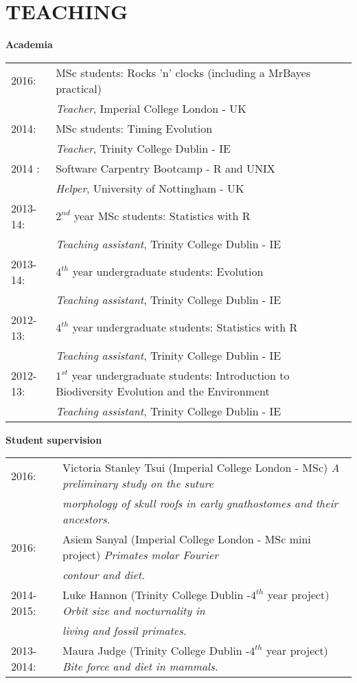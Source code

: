 \documentclass[10pt,a4paper]{article}
\begin{document}
{\section{TEACHING}
\bigskip

\raggedright\textbf{Academia}\\[1.5ex]
\begin{tabular}{ll}
2016: & MSc students: Rocks 'n' clocks (including a MrBayes practical)\\
& \textit{Teacher}, Imperial College London - UK \\
2014: & MSc students: Timing Evolution \\
& \textit{Teacher}, Trinity College Dublin - IE \\
2014 : & Software Carpentry Bootcamp - R and UNIX \\
& \textit{Helper}, University of Nottingham - UK \\
2013-14: & $2^{nd}$ year MSc students: Statistics with R \\
& \textit{Teaching assistant}, Trinity College Dublin - IE \\
2013-14: & $4^{th}$ year undergraduate students: Evolution\\
& \textit{Teaching assistant}, Trinity College Dublin - IE\\
2012-13: & $4^{th}$ year undergraduate students: Statistics with R\\
& \textit{Teaching assistant}, Trinity College Dublin - IE\\
2012-13: & $1^{st}$ year undergraduate students: Introduction to Biodiversity Evolution and the Environment\\
& \textit{Teaching assistant}, Trinity College Dublin - IE\\
\end{tabular}
\raggedright\textbf{Student supervision}\\[1.5ex]
\begin{tabular}{ll}
2016: & Victoria Stanley Tsui (Imperial College London - MSc) \textit{A preliminary study on the suture}\\
& \textit{morphology of skull roofs in early gnathostomes and their ancestors.}\\
2016: & Asiem Sanyal (Imperial College London - MSc mini project) \textit{Primates molar Fourier}\\
& \textit{contour and diet.}\\
2014-2015: & Luke Hannon (Trinity College Dublin -$4^{th}$ year project) \textit{Orbit size and nocturnality in}\\
& \textit{living and fossil primates.}\\
2013-2014: & Maura Judge (Trinity College Dublin -$4^{th}$ year project) \textit{Bite force and diet in mammals.} \\
\end{tabular}
\bigskip

}
\end{document}
